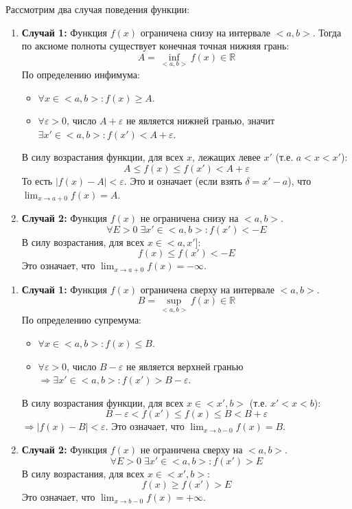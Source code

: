 \begin{tcolorbox}[title=Доказательство (для предела справа в точке $a$)]
	Рассмотрим два случая поведения функции:
	\begin{enumerate}
		\item \textbf{Случай 1:} Функция $f(x)$ ограничена снизу на интервале $<a, b>$.
		Тогда по аксиоме полноты существует конечная точная нижняя грань:
		\[ A = \inf_{<a,b>} f(x) \in \mathbb{R} \]
		По определению инфимума:
		\begin{itemize}
		    \item $\forall x \in <a,b>: f(x) \ge A$.
		    \item $\forall \varepsilon > 0$, число $A + \varepsilon$ не является нижней гранью, значит $\exists x' \in <a,b>: f(x') < A + \varepsilon$.
		\end{itemize}
		В силу возрастания функции, для всех $x$, лежащих левее $x'$ (т.е. $a < x < x'$):
		\[ A \leq f(x) \leq f(x') < A + \varepsilon \]
		То есть $|f(x) - A| < \varepsilon$.
		Это и означает (если взять $\delta = x' - a$), что $\lim_{x\to a +0} f(x) = A$.

		\item \textbf{Случай 2:} Функция $f(x)$ не ограничена снизу на $<a,b>$.
		\[ \forall E > 0\; \exists x' \in <a,b>: f(x') < -E \]
		В силу возрастания, для всех $x \in <a, x']$:
		\[ f(x) \leq f(x') < -E \]
		Это означает, что $\lim_{x\to a+0} f(x) = -\infty$.
	\end{enumerate}
\end{tcolorbox}

\begin{tcolorbox}[title=Доказательство (для предела слева в точке $b$)]
	\begin{enumerate}
		\item \textbf{Случай 1:} Функция $f(x)$ ограничена сверху на интервале $<a, b>$.
		\[ B = \sup_{<a,b>} f(x) \in \mathbb{R} \]
		По определению супремума:
		\begin{itemize}
		    \item $\forall x \in <a,b>: f(x) \le B$.
		    \item $\forall \varepsilon > 0$, число $B - \varepsilon$ не является верхней гранью $\Rightarrow \exists x' \in <a,b>: f(x') > B - \varepsilon$.
		\end{itemize}
		В силу возрастания функции, для всех $x \in <x', b>$ (т.е. $x' < x < b$):
		\[ B - \varepsilon < f(x') \leq f(x) \leq B < B + \varepsilon \]
		$\Rightarrow |f(x) - B| < \varepsilon$. Это означает, что $\lim_{x\to b-0} f(x) = B$.

		\item \textbf{Случай 2:} Функция $f(x)$ не ограничена сверху на $<a,b>$.
		\[ \forall E > 0\; \exists x' \in <a,b>: f(x') > E \]
		В силу возрастания, для всех $x \in <x', b>$:
		\[ f(x) \geq f(x') > E \]
		Это означает, что $\lim_{x\to b-0} f(x) = +\infty$.
	\end{enumerate}
\end{tcolorbox}


